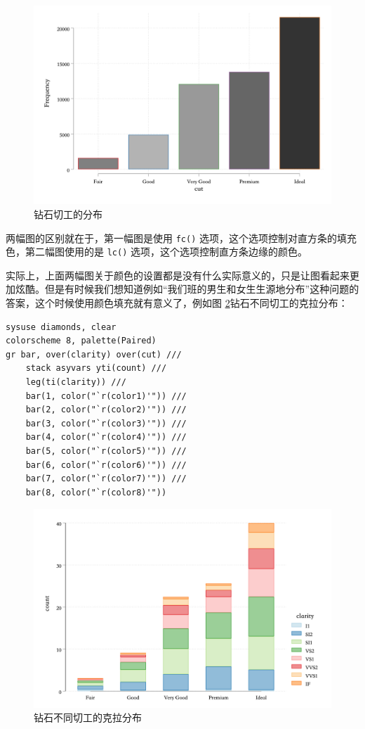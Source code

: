 \begin{figure}[htbp]
  \centering
  \includegraphics[width=\textwidth]{assets/barcutmulticolor2.png}
  \caption{钻石切工的分布}
  \label{fig:barcutmulticolor2}
\end{figure}

两幅图的区别就在于，第一幅图是使用 \texttt{fc()} 选项，这个选项控制对直方条的填充色，第二幅图使用的是 \texttt{lc()} 选项，这个选项控制直方条边缘的颜色。

实际上，上面两幅图关于颜色的设置都是没有什么实际意义的，只是让图看起来更加炫酷。但是有时候我们想知道例如``我们班的男生和女生生源地分布''这种问题的答案，这个时候使用颜色填充就有意义了，例如图 \ref{fig:stackcutclarity}钻石不同切工的克拉分布：

\begin{lstlisting}
sysuse diamonds, clear
colorscheme 8, palette(Paired)
gr bar, over(clarity) over(cut) ///
    stack asyvars yti(count) ///
    leg(ti(clarity)) ///
    bar(1, color("`r(color1)'")) ///
    bar(2, color("`r(color2)'")) ///
    bar(3, color("`r(color3)'")) ///
    bar(4, color("`r(color4)'")) ///
    bar(5, color("`r(color5)'")) ///
    bar(6, color("`r(color6)'")) ///
    bar(7, color("`r(color7)'")) ///
    bar(8, color("`r(color8)'"))
\end{lstlisting}

\begin{figure}[htbp]
  \centering
  \includegraphics[width=\textwidth]{assets/stackcutclarity.png}
  \caption{钻石不同切工的克拉分布}\label{fig:stackcutclarity}
\end{figure}

